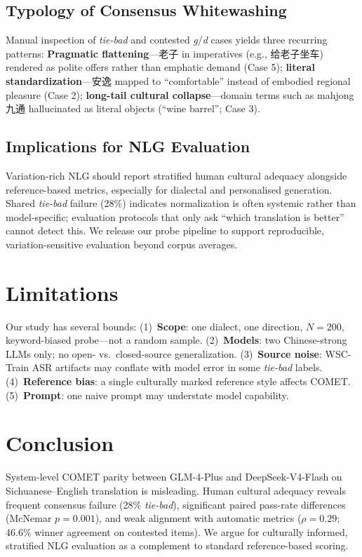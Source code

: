 \documentclass[11pt]{article}
\begin{document}
\subsection{Typology of Consensus Whitewashing}
Manual inspection of \emph{tie-bad} and contested \emph{g}/\emph{d} cases yields three recurring patterns:
\textbf{Pragmatic flattening}---老子 in imperatives (e.g., 给老子坐车) rendered as polite offers rather than emphatic demand (Case 5);
\textbf{literal standardization}---安逸 mapped to ``comfortable'' instead of embodied regional pleasure (Case 2);
\textbf{long-tail cultural collapse}---domain terms such as mahjong 九通 hallucinated as literal objects (``wine barrel''; Case 3).

\subsection{Implications for NLG Evaluation}
Variation-rich NLG should report stratified human cultural adequacy alongside reference-based metrics, especially for dialectal and personalised generation.
Shared \emph{tie-bad} failure (28\%) indicates normalization is often systemic rather than model-specific; evaluation protocols that only ask ``which translation is better'' cannot detect this.
We release our probe pipeline to support reproducible, variation-sensitive evaluation beyond corpus averages.

\section{Limitations}

Our study has several bounds:
(1)~\textbf{Scope}: one dialect, one direction, $N=200$, keyword-biased probe---not a random sample.
(2)~\textbf{Models}: two Chinese-strong LLMs only; no open- vs.\ closed-source generalization.
(3)~\textbf{Source noise}: WSC-Train ASR artifacts may conflate with model error in some \emph{tie-bad} labels.
(4)~\textbf{Reference bias}: a single culturally marked reference style affects COMET.
(5)~\textbf{Prompt}: one naive prompt may understate model capability.

\section{Conclusion}

System-level COMET parity between GLM-4-Plus and DeepSeek-V4-Flash on Sichuanese--English translation is misleading.
Human cultural adequacy reveals frequent consensus failure (28\% \emph{tie-bad}), significant paired pass-rate differences (McNemar $p=0.001$), and weak alignment with automatic metrics ($\rho=0.29$; 46.6\% winner agreement on contested items).
We argue for culturally informed, stratified NLG evaluation as a complement to standard reference-based scoring.
\end{document}
